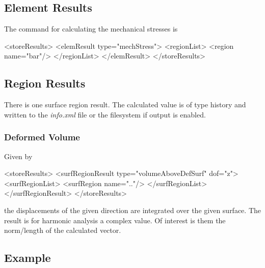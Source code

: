 \subsection{Element Results}
The command for calculating the mechanical stresses is
\begin{xmllisting}      
<storeResults>
   <elemResult type="mechStress">
    <regionList>
     <region name="bar"/>
    </regionList>
   </elemResult>
</storeResults>
\end{xmllisting}

\subsection{Region Results}
There is one surface region result. The calculated value is of type history and
written to the \textit{info.xml} file or the filesystem if  output
is enabled.

\subsubsection{Deformed Volume}
Given by 
\begin{xmllisting}      
<storeResults>
  <surfRegionResult type="volumeAboveDefSurf" dof="z">
    <surfRegionList>
      <surfRegion name=".."/>
    </surfRegionList>
 </surfRegionResult>
</storeResults>
\end{xmllisting}
the displacements of the given direction are integrated over the given surface.
The result is for harmonic analysis a complex value. Of interest is them the
norm/length of the calculated vector.

\subsection{Example}

